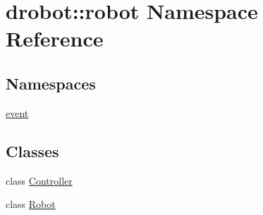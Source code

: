\hypertarget{namespacedrobot_1_1robot}{\section{drobot\-:\-:robot Namespace Reference}
\label{namespacedrobot_1_1robot}
}
\subsection*{Namespaces}
\begin{DoxyCompactItemize}
\item 
\hyperlink{namespacedrobot_1_1robot_1_1event}{event}
\end{DoxyCompactItemize}
\subsection*{Classes}
\begin{DoxyCompactItemize}
\item 
class \hyperlink{classdrobot_1_1robot_1_1Controller}{Controller}
\item 
class \hyperlink{classdrobot_1_1robot_1_1Robot}{Robot}
\end{DoxyCompactItemize}
